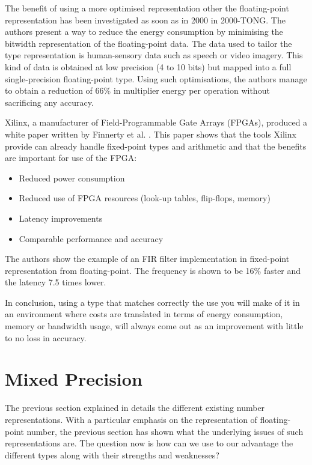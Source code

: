 
The benefit of using a more optimised representation other the floating-point representation has been investigated as soon as in 2000 in 2000-TONG. The authors present a way to reduce the energy consumption by minimising the bitwidth representation of the floating-point data. The data used to tailor the type representation is human-sensory data such as speech or video imagery. This kind of data is obtained at low precision (4 to 10 bits) but mapped into a full single-precision floating-point type. Using such optimisations, the authors manage to obtain a reduction of 66\% in multiplier energy per operation without sacrificing any accuracy.

Xilinx, a manufacturer of Field-Programmable Gate Arrays (FPGAs), produced a white paper written by Finnerty et al. \cite{Xilinx2017}. This paper shows that the tools Xilinx provide can already handle fixed-point types and arithmetic and that the benefits are important for use of the FPGA:
\begin{itemize}
  \item Reduced power consumption
  \item Reduced use of FPGA resources (look-up tables, flip-flops, memory)
  \item Latency improvements
  \item Comparable performance and accuracy
\end{itemize}
The authors show the example of an FIR filter implementation in fixed-point representation from floating-point. The frequency is shown to be 16\% faster and the latency 7.5 times lower.

In conclusion, using a type that matches correctly the use you will make of it in an environment where costs are translated in terms of energy consumption, memory or bandwidth usage, will always come out as an improvement with little to no loss in accuracy.


\section{Mixed Precision}

The previous section explained in details the different existing number representations. With a particular emphasis on the representation of floating-point number, the previous section has shown what the underlying issues of such representations are. The question now is how can we use to our advantage the different types along with their strengths and weaknesses?

